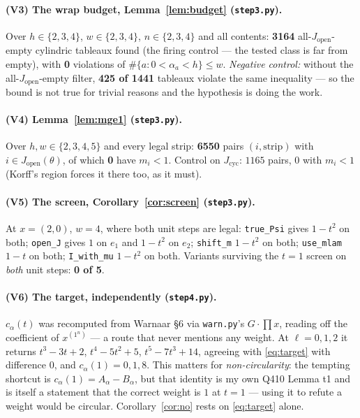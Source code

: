 \documentclass[11pt]{article}
\theoremstyle{plain}
\theoremstyle{definition}
\newcommand{\Jop}{J_{\mathrm{open}}}
\newcommand{\Jcyc}{J_{\mathrm{cyc}}}
\begin{document}
\paragraph{(V3) The wrap budget, Lemma~\ref{lem:budget} (\texttt{step3.py}).}
Over $h\in\{2,3,4\}$, $w\in\{2,3,4\}$, $n\in\{2,3,4\}$ and all contents: \textbf{3164}
all-$\Jop$-empty cylindric tableaux found (the firing control --- the tested class is far from
empty), with \textbf{0} violations of $\#\{a:0<\alpha_a<h\}\le w$.
\emph{Negative control:} without the all-$\Jop$-empty filter, \textbf{425 of 1441} tableaux
violate the same inequality --- so the bound is not true for trivial reasons and the hypothesis
is doing the work.

\paragraph{(V4) Lemma~\ref{lem:mge1} (\texttt{step3.py}).}
Over $h,w\in\{2,3,4,5\}$ and every legal strip: \textbf{6550} pairs $(i,\text{strip})$ with
$i\in\Jop(\theta)$, of which \textbf{0} have $m_i<1$. Control on $\Jcyc$: $1165$ pairs,
$0$ with $m_i<1$ (Korff's region forces it there too, as it must).

\paragraph{(V5) The screen, Corollary~\ref{cor:screen} (\texttt{step3.py}).}
At $x=(2,0)$, $w=4$, where both unit steps are legal: \texttt{true\_Psi} gives $1-t^2$ on both;
\texttt{open\_J} gives $1$ on $e_1$ and $1-t^2$ on $e_2$; \texttt{shift\_m} $1-t^2$ on both;
\texttt{use\_mlam} $1-t$ on both; \texttt{I\_with\_mu} $1-t^2$ on both. Variants surviving the
$t=1$ screen on \emph{both} unit steps: \textbf{0 of 5}.

\paragraph{(V6) The target, independently (\texttt{step4.py}).}
$c_\alpha(t)$ was recomputed from Warnaar \cite{Warnaar} \S6 via \texttt{warn.py}'s
$G\cdot\prod x$, reading off the coefficient of $x^{(1^n)}$ --- a route that never mentions any
weight. At $\ell=0,1,2$ it returns $t^3-3t+2$, $t^4-5t^2+5$, $t^5-7t^3+14$, agreeing with
\eqref{eq:target} with difference $0$, and $c_\alpha(1)=0,1,8$.
This matters for \emph{non-circularity}: the tempting shortcut is $c_\alpha(1)=A_\alpha-B_\alpha$,
but that identity is my own Q410 Lemma t1 and is itself a statement that the correct weight is
$1$ at $t=1$ --- using it to refute a weight would be circular. Corollary~\ref{cor:no} rests on
\eqref{eq:target} alone.
\end{document}
